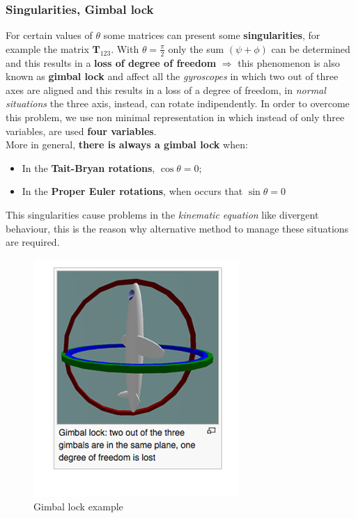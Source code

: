 {\color{blue}\subsubsection{Singularities, Gimbal lock}}
For certain values of $\theta$ some matrices can present some \textbf{singularities}, for example the matrix $\mathbf{T}_{123}$. With $\theta=\frac{\pi}{2}$ only the sum $(\psi+\phi)$ can be determined and this results in a \textbf{loss of degree of freedom} $\Longrightarrow$ this phenomenon is also known as \textbf{gimbal lock} and affect all the \textit{gyroscopes} in which two out of three axes are aligned and this results in a loss of a degree of freedom, in \textit{normal situations} the three axis, instead, can rotate indipendently.
In order to overcome this problem, we use non minimal representation in which instead of only three variables, are used \textbf{four variables}.\\
More in general, \textbf{there is always a gimbal lock} when: 
\begin{itemize}
    \itemsep0em
    \item[\ding{70}] In the \textbf{Tait-Bryan rotations}, $\cos\theta=0$;
    \item[\ding{70}] In the \textbf{Proper Euler rotations}, when occurs that $\sin\theta=0$   
\end{itemize}
This singularities cause problems in the \textit{kinematic equation} like divergent behaviour, this is the reason why alternative method to manage these situations are required.

\begin{figure}[h]  
    \centering
    \includegraphics[scale=1.3]{AerospaceApplications/images/gimbal_lock.png}
    \caption{Gimbal lock example}
\end{figure}

